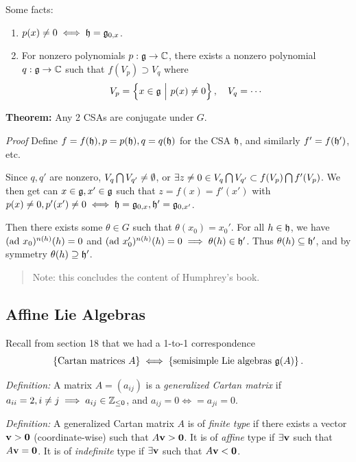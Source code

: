Some facts:

\begin{enumerate}
\def\labelenumi{\alph{enumi}.}
\tightlist
\item
  \(p(x) \neq 0 \iff {\mathfrak{h}} = {\mathfrak{g}}_{0, x}\).
\item
  For nonzero polynomials \(p: {\mathfrak{g}} \to {\mathbb{C}}\), there exists a nonzero
  polynomial \(q: {\mathfrak{g}} \to {\mathbb{C}}\) such that \(f(V_p) \supset V_q\) where
  \[
  V_p = \left\{{x\in{\mathfrak{g}}{~\mathrel{\Big|}~} p(x) \neq 0}\right\},\quad V_q = \cdots
  \]
\end{enumerate}

\textbf{Theorem:} Any 2 CSAs are conjugate under \(G\).

\emph{Proof} Define \(f= f({\mathfrak{h}}), p = p({\mathfrak{h}}), q= q({\mathfrak{h}})\) for the
CSA \({\mathfrak{h}}\), and similarly \(f' = f({\mathfrak{h}}')\), etc.

Since \(q, q'\) are nonzero, \(V_q \bigcap V_{q'} \neq \emptyset\),
or
\(\exists z\neq 0 \in V_q \bigcap V_{q'} \subset f(V_p) \bigcap f'(V_p)\).
We then get can \(x\in {\mathfrak{g}}, x' \in {\mathfrak{g}}\) such that
\(z = f(x) = f'(x')\) with
\(p(x) \neq 0, p'(x') \neq 0 \iff {\mathfrak{h}} = {\mathfrak{g}}_{0, x}, {\mathfrak{h}}' = {\mathfrak{g}}_{0, x'}\).

Then there exists some \(\theta \in G\) such that
\(\theta(x_0) = x_0'\). For all \(h \in {\mathfrak{h}}\), we have
\((\mathrm{ad}~ x_0)^{n(h)}(h) = 0\) and
\((\mathrm{ad}~ x_0')^{n(h)}(h) = 0 \implies \theta(h) \in {\mathfrak{h}}'\). Thus
\(\theta(h) \subseteq {\mathfrak{h}}'\), and by symmetry
\(\theta(h) \supseteq {\mathfrak{h}}'\).

\begin{quote}
Note: this concludes the content of Humphrey's book.
\end{quote}

\hypertarget{affine-lie-algebras}{%
\subsection{Affine Lie Algebras}\label{affine-lie-algebras}}

Recall from section 18 that we had a 1-to-1 correspondence \[
\left\{{\text{Cartan matrices } A}\right\} \iff \left\{{\text{semisimple Lie algebras } {\mathfrak{g}}(A)}\right\}.
\]

\emph{Definition:} A matrix \(A = (a_{ij})\) is a \emph{generalized
Cartan matrix} if
\(a_{ii} = 2, i\neq j \implies a_{ij} \in {\mathbb{Z}}_{\leq 0}\), and
\(a_{ij} = 0 \iff = a_{ji} = 0\).

\emph{Definition:} A generalized Cartan matrix \(A\) is of \emph{finite
type} if there exists a vector \(\mathbf{v} > \mathbf{0}\)
(coordinate-wise) such that \(A\mathbf{v} > \mathbf{0}\). It is of
\emph{affine} type if \(\exists \mathbf{v}\) such that
\(A \mathbf{v} = \mathbf{0}\). It is of \emph{indefinite} type if
\(\exists \mathbf{v}\) such that \(A \mathbf{v} < \mathbf{0}\).

